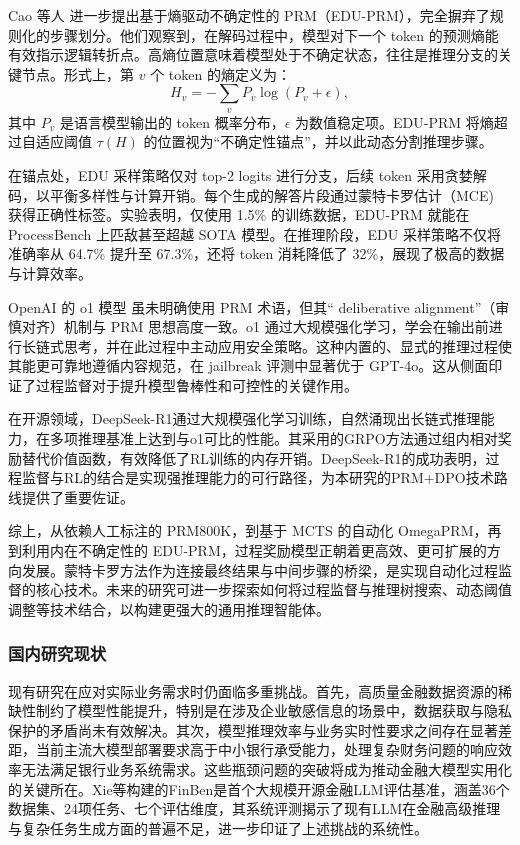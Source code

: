 \documentclass[professional,privacy,print,win,long,STEM,AutoFakeBold]{def/buaa}
\begin{document}
Cao 等人  进一步提出基于熵驱动不确定性的 PRM（EDU-PRM），完全摒弃了规则化的步骤划分。他们观察到，在解码过程中，模型对下一个 token 的预测熵能有效指示逻辑转折点。高熵位置意味着模型处于不确定状态，往往是推理分支的关键节点。形式上，第 $v$ 个 token 的熵定义为：
\[
H_v = -\sum_{v} P_v \log(P_v + \epsilon),
\]
其中 $P_v$ 是语言模型输出的 token 概率分布，$\epsilon$ 为数值稳定项。EDU-PRM 将熵超过自适应阈值 $\tau(H)$ 的位置视为“不确定性锚点”，并以此动态分割推理步骤。

在锚点处，EDU 采样策略仅对 top-2 logits 进行分支，后续 token 采用贪婪解码，以平衡多样性与计算开销。每个生成的解答片段通过蒙特卡罗估计（MCE) 获得正确性标签。实验表明，仅使用 1.5\% 的训练数据，EDU-PRM 就能在 ProcessBench 上匹敌甚至超越 SOTA 模型。在推理阶段，EDU 采样策略不仅将准确率从 64.7\% 提升至 67.3\%，还将 token 消耗降低了 32\%，展现了极高的数据与计算效率。

OpenAI 的 o1 模型  虽未明确使用 PRM 术语，但其“ deliberative alignment”（审慎对齐）机制与 PRM 思想高度一致。o1 通过大规模强化学习，学会在输出前进行长链式思考，并在此过程中主动应用安全策略。这种内置的、显式的推理过程使其能更可靠地遵循内容规范，在 jailbreak 评测中显著优于 GPT-4o。这从侧面印证了过程监督对于提升模型鲁棒性和可控性的关键作用。

在开源领域，DeepSeek-R1通过大规模强化学习训练，自然涌现出长链式推理能力，在多项推理基准上达到与o1可比的性能。其采用的GRPO方法通过组内相对奖励替代价值函数，有效降低了RL训练的内存开销。DeepSeek-R1的成功表明，过程监督与RL的结合是实现强推理能力的可行路径，为本研究的PRM+DPO技术路线提供了重要佐证。

综上，从依赖人工标注的 PRM800K，到基于 MCTS 的自动化 OmegaPRM，再到利用内在不确定性的 EDU-PRM，过程奖励模型正朝着更高效、更可扩展的方向发展。蒙特卡罗方法作为连接最终结果与中间步骤的桥梁，是实现自动化过程监督的核心技术。未来的研究可进一步探索如何将过程监督与推理树搜索、动态阈值调整等技术结合，以构建更强大的通用推理智能体。


\subsubsection{国内研究现状}

现有研究在应对实际业务需求时仍面临多重挑战。首先，高质量金融数据资源的稀缺性制约了模型性能提升，特别是在涉及企业敏感信息的场景中，数据获取与隐私保护的矛盾尚未有效解决。其次，模型推理效率与业务实时性要求之间存在显著差距，当前主流大模型部署要求高于中小银行承受能力，处理复杂财务问题的响应效率无法满足银行业务系统需求。这些瓶颈问题的突破将成为推动金融大模型实用化的关键所在。Xie等构建的FinBen是首个大规模开源金融LLM评估基准，涵盖36个数据集、24项任务、七个评估维度，其系统评测揭示了现有LLM在金融高级推理与复杂任务生成方面的普遍不足，进一步印证了上述挑战的系统性。
\end{document}
